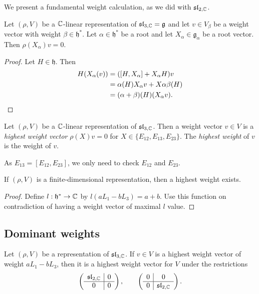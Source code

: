 We present a fundamental weight calculation, as we did with $\mathfrak{sl}_{2, \mathbb C}$. 

\begin{theorem}
    Let $(\rho, V)$ be a $\mathbb C$-linear representation of $\mathfrak{sl}_{3, \mathbb C} = \mathfrak g$ and let $v \in V_\beta$ be a weight vector with weight $\beta \in \mathfrak h^*$. Let $\alpha \in \mathfrak h^*$ be a root and let $X_\alpha \in \mathfrak g_\alpha$ be a root vector. Then $\rho(X_\alpha)v = 0$. 
\end{theorem}

\begin{proof}
    Let $H \in \mathfrak h$. Then
    \begin{align*}
        H(X_\alpha(v)) &= ([H, X_\alpha] + X_\alpha H)v \\
        &= \alpha(H) X_\alpha v + X\alpha \beta(H) \\
        &= (\alpha + \beta)(H) (X_\alpha v). \qedhere
    \end{align*}
\end{proof}

\begin{definition}
    Let $(\rho, V)$ be a $\mathbb C$-linear representation of $\mathfrak{sl}_{3, \mathbb C}$. Then a weight vector $v \in V$ is a \emph{highest weight vector} $\rho(X)v = 0$ for $X \in \{E_{12}, E_{13}, E_{23}\}$. The \emph{highest weight} of $v$ is the weight of $v$. 
\end{definition}

As $E_{13} = [E_{12}, E_{23}]$, we only need to check $E_{12}$ and $E_{23}$. 

\begin{proposition}
    If $(\rho, V)$ is a finite-dimensional representation, then a highest weight exists. 
\end{proposition}

\begin{proof}
    Define $l: \mathfrak h^* \to \mathbb C$ by $l(aL_1 - bL_3) = a + b$. Use this function on contradiction of having a weight vector of maximal $l$ value. 
\end{proof}

\subsection{Dominant weights}

Let $(\rho, V)$ be a representation of $\mathfrak{sl}_{3, \mathbb C}$. If $v \in V$ is a highest weight vector of weight $aL_1 - bL_3$, then it is a highest weight vector for $V$ under the restrictions
\[
    \left(
        \begin{array}{c|c}
            \mathfrak{sl}_{2, \mathbb C} & 0 \\ \hline
            0 & 0 \\
        \end{array}
    \right), \qquad 
    \left(
        \begin{array}{c|c}
            0 & 0 \\ \hline
            0 & \mathfrak{sl}_{2, \mathbb C} \\
        \end{array}
    \right).
\]

